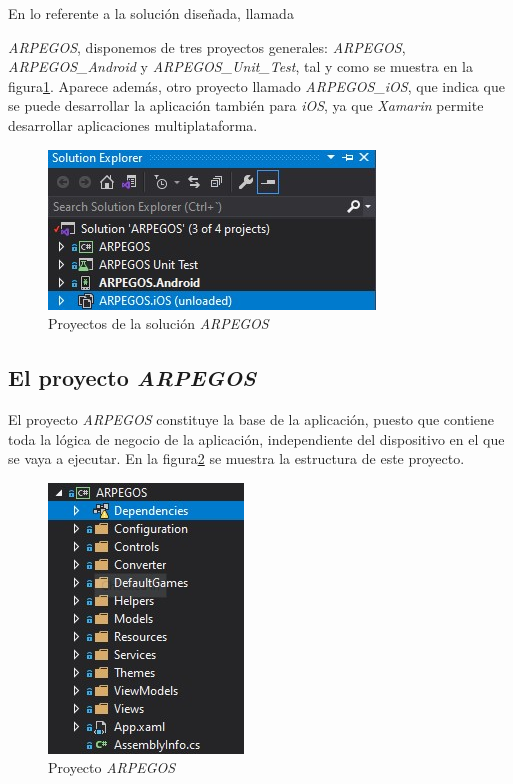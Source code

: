 En lo referente a la solución diseñada, llamada {\textit{ARPEGOS}, disponemos de tres proyectos generales: \textit{ARPEGOS}, 
\textit{ARPEGOS\_Android} y \textit{ARPEGOS\_Unit\_Test}, tal y como se muestra en la figura\ref*{SolutionProjects}. Aparece además, 
otro proyecto llamado \textit{ARPEGOS\_iOS}, que indica que se puede desarrollar la aplicación también para \textit{iOS}, ya 
que \textit{Xamarin} permite desarrollar aplicaciones multiplataforma.


\begin{figure}[H]
    \centering
    \includegraphics[scale=1.5]{Images/Solution_Projects.jpg}
    \caption{Proyectos de la solución \textit{ARPEGOS}}
    \label{SolutionProjects}    
\end{figure}

\subsection{El proyecto \textit{ARPEGOS}}
El proyecto \textit{ARPEGOS} constituye la base de la aplicación, puesto que contiene toda la lógica de negocio de la aplicación, 
independiente del dispositivo en el que se vaya a ejecutar. En la figura\ref*{SolutionARPEGOS} se muestra la estructura de este proyecto.

\begin{figure}[H]
    \centering
    \includegraphics[scale=1.5]{Images/Solution_ARPEGOS_Project.jpg}
    \caption{Proyecto \textit{ARPEGOS}}
    \label{SolutionARPEGOS}    
\end{figure}
\newpage

}
